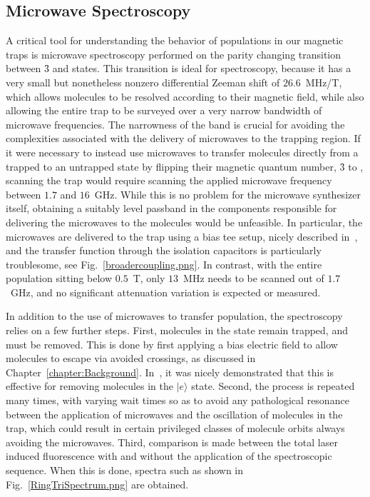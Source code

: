 \documentclass[defaultstyle,11pt]{thesis}
\begin{document}
\subsection{Microwave Spectroscopy}

A critical tool for understanding the behavior of populations in our magnetic traps is microwave spectroscopy performed on the parity changing transition between \f3 and  states.
This transition is ideal for spectroscopy, because it has a very small but nonetheless nonzero differential Zeeman shift of $26.6$~MHz/T, which allows molecules to be resolved according to their magnetic field, while also allowing the entire trap to be surveyed over a very narrow bandwidth of microwave frequencies.
The narrowness of the band is crucial for avoiding the complexities associated with the delivery of microwaves to the trapping region.
If it were necessary to instead use microwaves to transfer molecules directly from a trapped to an untrapped state by flipping their magnetic quantum number, \f3 to , scanning the trap would require scanning the applied microwave frequency between $1.7$ and $16$~GHz.
While this is no problem for the microwave synthesizer itself, obtaining a suitably level passband in the components responsible for delivering the microwaves to the molecules would be unfeasible.
In particular, the microwaves are delivered to the trap using a bias tee setup, nicely described in~\citep[Fig.~5]{Stuhl2012uwave}, and the transfer function through the isolation capacitors is particularly troublesome, see Fig.~\ref{broadercoupling.png}.
In contrast, with the entire population sitting below $0.5$~T, only $13$~MHz needs to be scanned out of $1.7$~GHz, and no significant attenuation variation is expected or measured.


In addition to the use of microwaves to transfer population, the spectroscopy relies on a few further steps.
First, molecules in the  state remain trapped, and must be removed.
This is done by first applying a bias electric field to allow molecules to escape via avoided crossings, as discussed in Chapter~\ref{chapter:Background}.
In~\cite{Stuhl2012uwave}, it was nicely demonstrated that this is effective for removing molecules in the $|e\rangle$ state.
Second, the process is repeated many times, with varying wait times so as to avoid any pathological resonance between the application of microwaves and the oscillation of molecules in the trap, which could result in certain privileged classes of molecule orbits always avoiding the microwaves.
Third, comparison is made between the total laser induced fluorescence with and without the application of the spectroscopic sequence.
When this is done, spectra such as shown in Fig.~\ref{RingTriSpectrum.png} are obtained.
\end{document}
